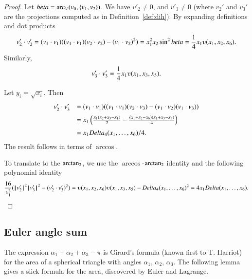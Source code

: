 \begin{proof}
Let $beta = \operatorname{arc}_V(v_0,\{v_1,v_2\})$.
We have $v'_2\ne 0$, and $v'_3 \ne 0$ (where $v_2'$ and
$v_3'$ are the projections computed as in Definition~\ref{def:dih}).  
    By expanding definitions and dot products
    $$
    v'_2\cdot v'_2 = (v_1\cdot v_1) ((v_1\cdot v_1)(v_2\cdot v_2) -
    (v_1\cdot v_2)^2) =  x_1^2 x_2 \sin^2 \beta = \frac{1}{4}
    x_1
    \ups(x_1,x_2,x_6).
    $$
    Similarly,
    $$v'_3 \cdot v'_3 = \frac{1}{4} x_1 \ups(x_1,x_3,x_5).$$

Let $y_i = \sqrt{x_i}$. Then
    $$\begin{array}{lll}
    v'_2\cdot v'_3 &= (v_1\cdot v_1)((v_1\cdot v_1)(v_2\cdot v_3) -
    (v_1\cdot v_2)(v_1\cdot v_3) ) \vspace{6pt} \\  &
    = x_1 \left(\frac{ x_1 (x_2 + x_3 -
    x_1)}{2} - \frac{(x_1 + x_2 - x_6)(x_1 + x_3 -
    x_5)}{4} \right)\vspace{6pt}\\&
    = {x_1\Delta_4(x_1,\ldots,x_6)}/{4}.
    \end{array}
    $$
The result follows in terms of $\arccos$.

To translate to the ${\operatorname{arctan_2}}$, 
we use the $\arccos$-${\operatorname{arctan_2}}$ identity
and the following polynomial identity
    $$
    \frac{16}{x_1^2}(\normo{v'_2}^2 \normo{v'_3}^2 - (v'_2\cdot v'_3)^2) =
    \ups(x_1,x_2,x_6)\ups(x_1,x_3,x_5) - \Delta_4(x_1,\ldots,x_6)^2
    = 4 x_1 \Delta(x_1,\ldots,x_6).
    $$
\end{proof}






\subsection{Euler angle sum}

The expression $\alpha_1+\alpha_2+\alpha_3-\pi$ is Girard's
formula (known first to T. Harriot) 
for the area of a spherical triangle with angles
$\alpha_1$, $\alpha_2$, $\alpha_3$.  The following lemma
gives a slick formula for the area, discovered by
Euler and Lagrange.

